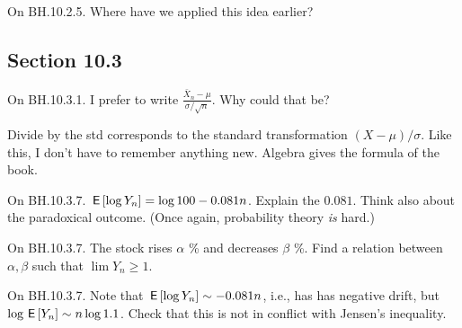 \begin{exercise}
On BH.10.2.5. Where have we applied this idea earlier?
\begin{hint}
\end{hint}
\begin{solution}
\end{solution}
\end{exercise}



\subsection*{Section 10.3}
\label{sec:section-10.3}

\begin{exercise}
On BH.10.3.1. I prefer to write $\frac{\bar X_n-\mu}{\sigma/\sqrt n}$. Why could that be?
\begin{solution}
Divide by the std corresponds to the standard transformation $(X-\mu)/\sigma$. Like this, I don't have to remember anything new. Algebra gives the formula of the book.
\end{solution}
\end{exercise}


\begin{exercise}
On BH.10.3.7. $\,\mathsf{E}\left[\log Y_n\right]=\log 100 - 0.081n$. Explain the $0.081$. Think also about the paradoxical outcome. (Once again, probability theory \emph{is} hard.)
\begin{hint}
\end{hint}
\begin{solution}
\end{solution}
\end{exercise}

\begin{exercise}
On BH.10.3.7. The stock rises $\alpha$ \% and decreases $\beta$ \%. Find a relation between  $\alpha, \beta$  such that $\lim Y_{n}\geq 1$.
\begin{hint}
\end{hint}
\begin{solution}
\end{solution}
\end{exercise}

\begin{exercise}
On BH.10.3.7. Note that $\,\mathsf{E}\left[\log Y_n\right] \sim -0.081 n$, i.e., has has negative drift, but $\log \,\mathsf{E}\left[Y_n\right] \sim n \log 1.1$. Check that this is not in conflict with Jensen's inequality.
\begin{hint}
\end{hint}
\begin{solution}
\end{solution}
\end{exercise}


